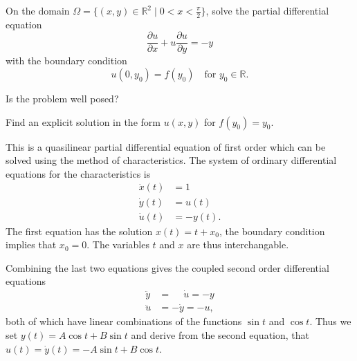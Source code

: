 On the domain $\Omega=\{(x,y)\in\mathbb{R}^2 \mid 0 < x < \frac{\pi}2\}$,
solve the
partial differential equation
\begin{equation}
\frac{\partial u}{\partial x}
+
u\frac{\partial u}{\partial y}
=
-y
\end{equation}
with the boundary condition
\[
u(0,y_0) = f(y_0)\quad \text{for $y_0\in\mathbb{R}$}.
\]
\begin{teilaufgaben}
\item
Is the problem well posed?
\item
Find an explicit solution in the form $u(x,y)$ for $f(y_0)=y_0$.
\end{teilaufgaben}

\begin{loesung}
This is a quasilinear partial differential equation of first order which
can be solved using the method of characteristics.
The system of ordinary differential equations for the characteristics
is
\begin{align*}
\dot{x}(t) &=  1 \\
\dot{y}(t) &=  u(t) \\
\dot{u}(t) &= -y(t).
\end{align*}
The first equation has the solution $x(t)=t+x_0$, the boundary condition
implies that $x_0=0$.
The variables $t$ and $x$ are thus interchangable.

Combining the last two equations gives the coupled second order differential
equations
\begin{align*}
\ddot{y} &= \phantom{-}\dot{u} = -y \\
\ddot{u} &=          - \dot{y} = -u,
\end{align*}
both of which have linear combinations of the functions $\sin t$ and
$\cos t$.
Thus we set $y(t) = A\cos t + B \sin t$ and derive from the second
equation, that $u(t) = \dot{y}(t) = -A\sin t + B \cos t$.


\end{loesung}
